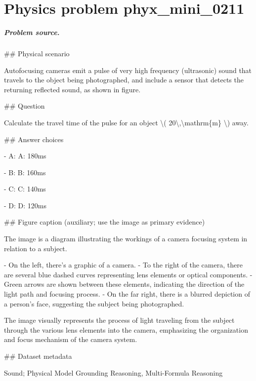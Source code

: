 
\chapter{Physics problem phyx\_mini\_0211}
\label{ch:PhyXMiniProblems_problem_phyx_mini_0211}

\paragraph{Problem source.}
\#\# Physical scenario

Autofocusing cameras emit a pulse of very high frequency (ultrasonic) sound that travels to the object being photographed, and include a sensor that detects the returning reflected sound, as shown in figure.

\#\# Question

Calculate the travel time of the pulse for an object \textbackslash{}( 20\textbackslash{},\textbackslash{}mathrm\{m\} \textbackslash{}) away.

\#\# Answer choices

- A: A: 180ms

- B: B: 160ms

- C: C: 140ms

- D: D: 120ms

\#\# Figure caption (auxiliary; use the image as primary evidence)

The image is a diagram illustrating the workings of a camera focusing system in relation to a subject. 

- On the left, there's a graphic of a camera.
- To the right of the camera, there are several blue dashed curves representing lens elements or optical components.
- Green arrows are shown between these elements, indicating the direction of the light path and focusing process.
- On the far right, there is a blurred depiction of a person's face, suggesting the subject being photographed.

The image visually represents the process of light traveling from the subject through the various lens elements into the camera, emphasizing the organization and focus mechanism of the camera system.

\#\# Dataset metadata

Sound; Physical Model Grounding Reasoning, Multi-Formula Reasoning

